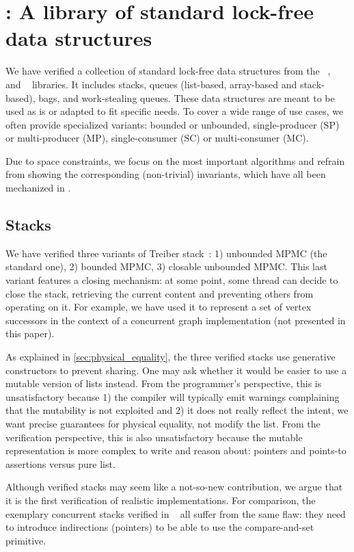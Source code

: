 \section{\Saturn: A library of standard lock-free data structures}
\label{sec:saturn}

We have verified a collection of standard lock-free data structures from the \Saturn~\citep*{saturn}, \Eio~\citep*{eio} and \Picos~\citep*{picos} libraries.
It includes stacks, queues (list-based, array-based and stack-based), bags, and work-stealing queues.
These data structures are meant to be used as is or adapted to fit specific needs.
To cover a wide range of use cases, we often provide specialized variants: bounded or unbounded, single-producer (SP) or multi-producer (MP), single-consumer (SC) or multi-consumer (MC).

Due to space constraints, we focus on the most important algorithms and refrain from showing the corresponding (non-trivial) \Iris invariants, which have all been mechanized in \Rocq.

\subsection{Stacks}

We have verified three variants of Treiber stack~\citep*{thomas1986systems}: 1) unbounded MPMC (the standard one), 2) bounded MPMC, 3) closable unbounded MPMC.
This last variant features a closing mechanism: at some point, some thread can decide to close the stack, retrieving the current content and preventing others from operating on it.
For example, we have used it to represent a set of vertex successors in the context of a concurrent graph implementation (not presented in this paper).

As explained in \cref{sec:physical_equality}, the three verified stacks use generative constructors to prevent sharing.
One may ask whether it would be easier to use a mutable version of lists instead.
From the programmer's perspective, this is unsatisfactory because 1) the compiler will typically emit warnings complaining that the mutability is not exploited and 2) it does not really reflect the intent, \ie we want precise guarantees for physical equality, not modify the list.
From the verification perspective, this is also unsatisfactory because the mutable representation is more complex to write and reason about: pointers and points-to assertions versus pure \Rocq list.

Although verified stacks may seem like a not-so-new contribution, we argue that it is the first verification of realistic \OCaml implementations.
For comparison, the exemplary concurrent stacks verified in \Iris~\citep*{iris-examples} all suffer from the same flaw: they need to introduce indirections (pointers) to be able to use the compare-and-set primitive.

